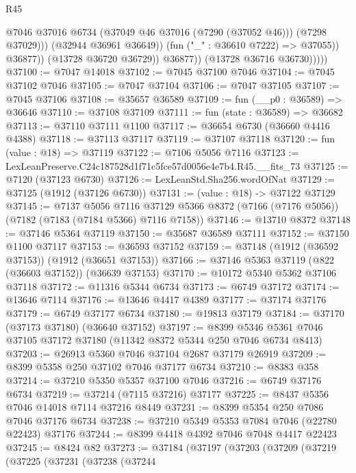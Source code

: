 \begin{lexlean}{R45}
\begin{coremodule}
{                              @7046
                              @37016
                              @6734
                              (@37049 @46 @37016 (@7290 (@37052 @46)))
                              (@7298 @37029)))
                          (@32944 @36961 @36649))
                        (fun ("_" : @36610 @7222) => @37055))
                      @36877))
                  (@13728 @36720 @36729))
                @36877))
            (@13728 @36716 @36730)))))
@37100 := @7047 @14018
@37102 := @7045 @37100 @7046
@37104 := @7045 @37102 @7046
@37105 := @7047 @37104
@37106 := @7047 @37105
@37107 := @7045 @37106
@37108 := @35657 @36589
@37109 := fun (__p0 : @36589) => @36646
@37110 := @37108 @37109
@37111 := fun (state : @36589) => @36682
@37113 := @37110 @37111 @1100
@37117 := @36654 @6730 (@36660 @4416 @4388)
@37118 := @37113 @37117
@37119 := @37107 @37118
@37120 := fun (value : @18) => @37119
@37122 := @7106 @5056 @7116
@37123 := LexLeanPreserve.C24c187528d1f71c5fce57d0056e4e7b4.R45.__fits_73
@37125 := @7120 (@37123 @6730)
@37126 := LexLeanStd.Sha256.wordOfNat
@37129 := @37125 (@1912 (@37126 @6730))
@37131 := (value : @18) -> @37122 @37129
@37145 := @7137
    @5056
    @7116
    @37129
    @5366
    @8372
    (@7166 (@7176 @5056))
    (@7182 (@7183 (@7184 @5366) @7116 @7158))
@37146 := @13710 @8372
@37148 := @37146 @5364 @37119
@37150 := @35687 @36589 @37111
@37152 := @37150 @1100 @37117
@37153 := @36593 @37152
@37159 := @37148 (@1912 (@36592 @37153)) (@1912 (@36651 @37153))
@37166 := @37146 @5363 @37119 (@822 (@36603 @37152)) (@36639 @37153)
@37170 := @10172 @5340 @5362 @37106 @37118
@37172 := @11316 @5344 @6734
@37173 := @6749 @37172
@37174 := @13646 @7114
@37176 := @13646 @4417 @4389
@37177 := @37174 @37176
@37179 := @6749 @37177 @6734
@37180 := @19813 @37179
@37184 := @37170 (@37173 @37180) (@36640 @37152)
@37197 := @8399 @5346 @5361 @7046 @37105 @37172 @37180 (@11342 @8372 @5344 @250 @7046 @6734 @8413)
@37203 := @26913 @5360 @7046 @37104 @2687 @37179 @26919
@37209 := @8399 @5358 @250 @37102 @7046 @37177 @6734
@37210 := @8383 @358
@37214 := @37210 @5350 @5357 @37100 @7046
@37216 := @6749 @37176 @6734
@37219 := @37214 (@7115 @37216) @37177
@37225 := @8437 @5356 @7046 @14018 @7114 @37216 @8449
@37231 := @8399 @5354 @250 @7086 @7046 @37176 @6734
@37238 := @37210 @5349 @5353 @7084 @7046 (@22780 @22423) @37176
@37244 := @8399 @4418 @4392 @7046 @7048 @4417 @22423
@37245 := @8424 @82
@37273 := @37184
    (@37197
      (@37203
        (@37209
          (@37219
            (@37225
              (@37231
                (@37238
                  (@37244
}
\end{coremodule}
\end{lexlean}
